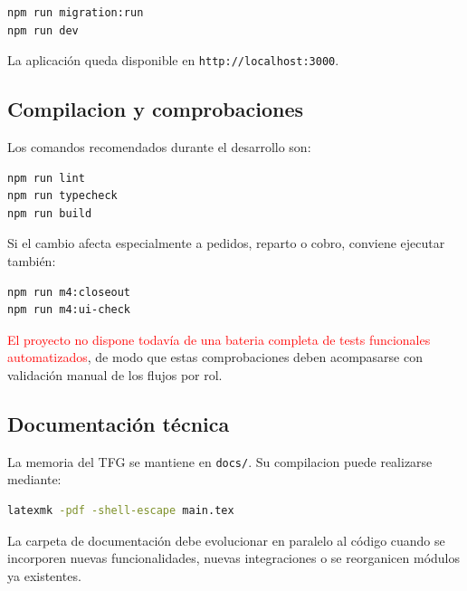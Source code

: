 \begin{lstlisting}[language=bash]
npm run migration:run
npm run dev
\end{lstlisting}

La aplicación queda disponible en \texttt{http://localhost:3000}.

\subsection{Compilacion y comprobaciones}

Los comandos recomendados durante el desarrollo son:

\begin{lstlisting}[language=bash]
npm run lint
npm run typecheck
npm run build
\end{lstlisting}

Si el cambio afecta especialmente a pedidos, reparto o cobro, conviene ejecutar también:

\begin{lstlisting}[language=bash]
npm run m4:closeout
npm run m4:ui-check
\end{lstlisting}

\textcolor{red}{El proyecto no dispone todavía de una bateria completa de tests funcionales automatizados}, de modo que estas comprobaciones deben acompasarse con validación manual de los flujos por rol.

\subsection{Documentación técnica}

La memoria del TFG se mantiene en \texttt{docs/}. Su compilacion puede realizarse mediante:

\begin{lstlisting}[language=bash]
latexmk -pdf -shell-escape main.tex
\end{lstlisting}

La carpeta de documentación debe evolucionar en paralelo al código cuando se incorporen nuevas funcionalidades, nuevas integraciones o se reorganicen módulos ya existentes.

